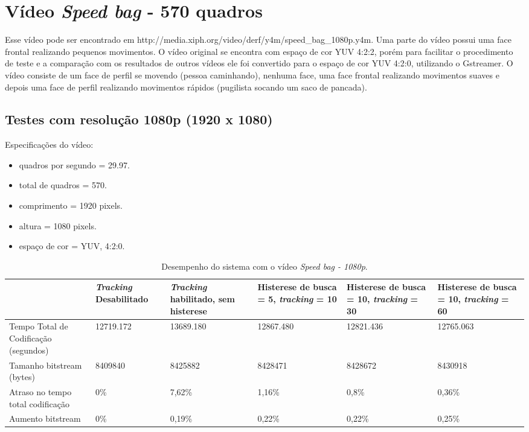 \section{ Vídeo \textit{Speed bag} - 570 quadros }


Esse vídeo pode ser encontrado em http://media.xiph.org/video/derf/y4m/speed\_bag\_1080p.y4m. Uma parte do vídeo possui uma face frontal realizando pequenos movimentos. O vídeo original se encontra com espaço de cor YUV 4:2:2, porém para facilitar o procedimento de teste e a comparação com os resultados de outros vídeos ele foi convertido para o espaço de cor YUV 4:2:0, utilizando o Gstreamer. O vídeo consiste de um face de perfil se movendo (pessoa caminhando), nenhuma face, uma face frontal realizando movimentos suaves e depois uma face de perfil realizando movimentos rápidos (pugilista socando um saco de pancada).


\subsection{ Testes com resolução 1080p (1920 x 1080) }

Especificações do vídeo:

\begin{itemize}
        \item quadros por segundo = 29.97.
        \item total de quadros    = 570.
        \item comprimento         = 1920 pixels.
        \item altura              = 1080 pixels.
        \item espaço de cor       = YUV, 4:2:0.
\end{itemize}


\begin{table}[H]
\begin{center}
\begin{tabular}{|p{2.3cm}|p{2.3cm}|p{2.3cm}|p{2.3cm}|p{2.3cm}|p{2.3cm}|}
\hline
\textbf{} & \textbf{\textit{Tracking} Desabilitado} & \textbf{\textit{Tracking} habilitado, sem histerese} & \textbf{Histerese de busca = 5, \textit{tracking} = 10} & \textbf{Histerese de busca = 10, \textit{tracking} = 30} & \textbf{Histerese de busca = 10, \textit{tracking} = 60} \\
\hline
Tempo Total de Codificação (segundos) & 12719.172 & 13689.180 & 12867.480 & 12821.436 & 12765.063 \\
\hline
Tamanho bitstream (bytes) & 8409840 & 8425882 & 8428471 & 8428672 & 8430918 \\
\hline
Atraso no tempo total codificação & 0\% & 7,62\% & 1,16\% & 0,8\% & 0,36\% \\
\hline
Aumento bitstream  & 0\% & 0,19\% & 0,22\% & 0,22\% & 0,25\% \\
\hline
\end{tabular}
\caption{Desempenho do sistema com o vídeo \textit{Speed bag - 1080p}.}
\label{tab:space_overhead}
\end{center}
\end{table}

